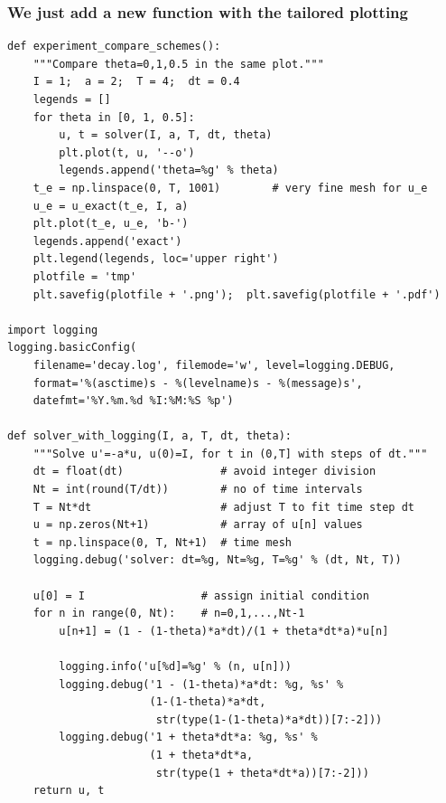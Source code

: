 \documentclass{beamer}
\begin{document}
\begin{frame}
\frametitle{We just add a new function with the tailored plotting}

\begin{verbatim}
def experiment_compare_schemes():
    """Compare theta=0,1,0.5 in the same plot."""
    I = 1;  a = 2;  T = 4;  dt = 0.4
    legends = []
    for theta in [0, 1, 0.5]:
        u, t = solver(I, a, T, dt, theta)
        plt.plot(t, u, '--o')
        legends.append('theta=%g' % theta)
    t_e = np.linspace(0, T, 1001)        # very fine mesh for u_e
    u_e = u_exact(t_e, I, a)
    plt.plot(t_e, u_e, 'b-')
    legends.append('exact')
    plt.legend(legends, loc='upper right')
    plotfile = 'tmp'
    plt.savefig(plotfile + '.png');  plt.savefig(plotfile + '.pdf')

import logging
logging.basicConfig(
    filename='decay.log', filemode='w', level=logging.DEBUG,
    format='%(asctime)s - %(levelname)s - %(message)s',
    datefmt='%Y.%m.%d %I:%M:%S %p')

def solver_with_logging(I, a, T, dt, theta):
    """Solve u'=-a*u, u(0)=I, for t in (0,T] with steps of dt."""
    dt = float(dt)               # avoid integer division
    Nt = int(round(T/dt))        # no of time intervals
    T = Nt*dt                    # adjust T to fit time step dt
    u = np.zeros(Nt+1)           # array of u[n] values
    t = np.linspace(0, T, Nt+1)  # time mesh
    logging.debug('solver: dt=%g, Nt=%g, T=%g' % (dt, Nt, T))

    u[0] = I                  # assign initial condition
    for n in range(0, Nt):    # n=0,1,...,Nt-1
        u[n+1] = (1 - (1-theta)*a*dt)/(1 + theta*dt*a)*u[n]

        logging.info('u[%d]=%g' % (n, u[n]))
        logging.debug('1 - (1-theta)*a*dt: %g, %s' %
                      (1-(1-theta)*a*dt,
                       str(type(1-(1-theta)*a*dt))[7:-2]))
        logging.debug('1 + theta*dt*a: %g, %s' %
                      (1 + theta*dt*a,
                       str(type(1 + theta*dt*a))[7:-2]))
    return u, t
\end{verbatim}
\end{frame}
\end{document}
